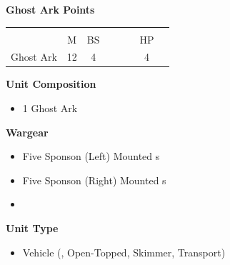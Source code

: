 \newpage
\subsubsection[Ghost Ark]{}
\hspace{0.5em}
\begin{minipage}[t]{0.72\textwidth}
	{\large \textbf{Ghost Ark  Points}}
	\begin{NiceTabular}{m{145 pt} *{2}{c} | *{3}{c} | c | c }
		& & &  & & & &  \\
		& M & BS &  &  &  & HP &  \\
		\hline
		Ghost Ark & 12 & 4 &  &  &  & 4 & \\
	\end{NiceTabular}
	\small
	\begin{minipage}[t]{0.5\textwidth}
		\begin{flushleft}
			\vspace*{2em}
			\textbf{Unit Composition}
			\begin{itemize}
				\item 1 Ghost Ark
			\end{itemize}
			
			\textbf{Wargear}
			\begin{itemize}
				\item Five Sponson (Left) Mounted s
				\item Five Sponson (Right) Mounted s
				\item {}
			\end{itemize}
		\end{flushleft}
	\end{minipage}
	\begin{minipage}[t]{0.5\textwidth}
		\begin{flushleft}
			\vspace*{2em}
			\textbf{Unit Type}
			\begin{itemize}
				\item Vehicle (, Open-Topped, Skimmer, Transport)
			\end{itemize}
			

\end{flushleft}
\end{minipage}
\end{minipage}
